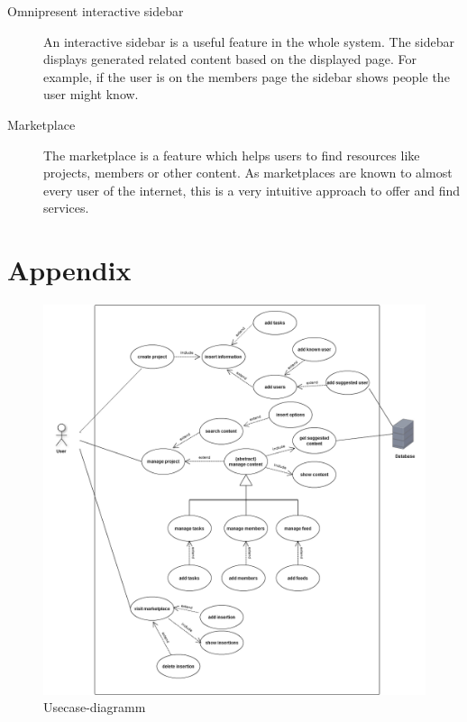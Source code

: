 \documentclass[a4paper,oneside,titlepage]{article}
\begin{document}
\begin{description}
	\item[Omnipresent interactive sidebar] An interactive sidebar is a useful feature in the whole system. The sidebar displays generated related content based on the displayed page. For example, if the user is on the members page the sidebar shows people the user might know.
	\item[Marketplace] The marketplace is a feature which helps users to find resources like projects, members or other content. As marketplaces are known to almost every user of the internet, this is a very intuitive approach to offer and find services. 
\end{description}

\pagebreak
\section*{Appendix}
\label{sec:appendix}

\begin{figure}[h]
  	\centering
    \includegraphics[width=\textwidth]{"UseCase Workshop"}
  \caption{Usecase-diagramm}
  \label{usecase}
\end{figure}
\end{document}
